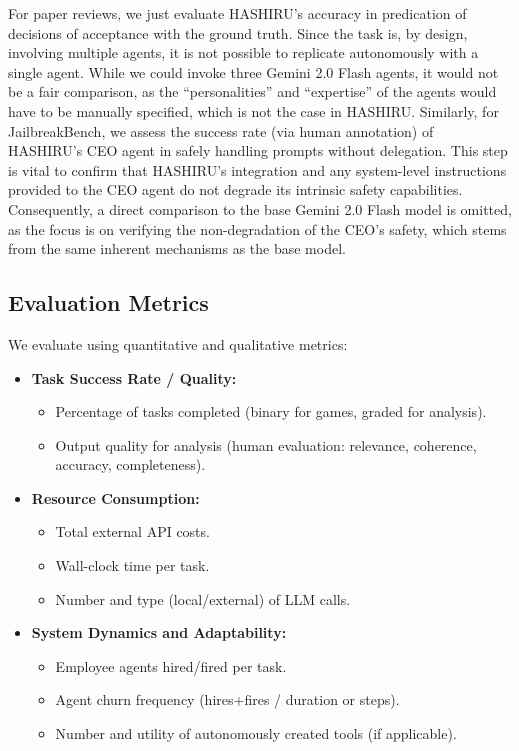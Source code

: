 \documentclass[conference]{IEEEtran}
\begin{document}
For paper reviews, we just evaluate HASHIRU's accuracy in predication of decisions of acceptance with the ground truth. Since the task is, by design, involving multiple agents, it is not possible to replicate autonomously with a single agent.
While we could invoke three Gemini 2.0 Flash agents, it would not be a fair comparison, as the ``personalities'' and ``expertise'' of the agents would have to be manually specified, which is not the case in HASHIRU.
Similarly, for JailbreakBench, we assess the success rate (via human annotation) of HASHIRU's CEO agent in safely handling prompts without delegation.
This step is vital to confirm that HASHIRU's integration and any system-level instructions provided to the CEO agent do not degrade its intrinsic safety capabilities.
Consequently, a direct comparison to the base Gemini 2.0 Flash model is omitted, as the focus is on verifying the non-degradation of the CEO's safety, which stems from the same inherent mechanisms as the base model.

\subsection{Evaluation Metrics}
\label{subsec:metrics}
We evaluate using quantitative and qualitative metrics:
\begin{itemize}
    \item \textbf{Task Success Rate / Quality:}
        \begin{itemize}
            \item Percentage of tasks completed (binary for games, graded for analysis).
            \item Output quality for analysis (human evaluation: relevance, coherence, accuracy, completeness).
        \end{itemize}
    \item \textbf{Resource Consumption:}
        \begin{itemize}
            \item Total external API costs.
            \item Wall-clock time per task.
            \item Number and type (local/external) of LLM calls.
        \end{itemize}
    \item \textbf{System Dynamics and Adaptability:}
        \begin{itemize}
            \item Employee agents hired/fired per task.
            \item Agent churn frequency (hires+fires / duration or steps).
            \item Number and utility of autonomously created tools (if applicable).
        \end{itemize}
\end{itemize}
\end{document}
